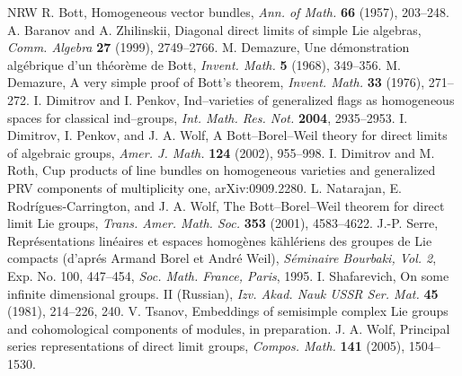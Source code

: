 \documentclass[12pt]{amsart}
\theoremstyle{remark}
\begin{document}
%
\begin{thebibliography}{NRW}
R. Bott, Homogeneous vector bundles, {\it Ann. of Math.} {\bf 66} (1957), 203--248.
A. Baranov and A. Zhilinskii, Diagonal direct limits of simple Lie algebras, 
{\it Comm. Algebra}  {\bf 27} (1999), 2749--2766.
M. Demazure, Une d\'emonstration alg\'ebrique d'un th\'eor\`eme de Bott, {\it Invent. Math.} 
{\bf 5} (1968), 349--356. 
M. Demazure, A very simple proof of Bott's theorem, {\it Invent. Math.} {\bf 33} (1976), 271--272.
I. Dimitrov and I. Penkov, Ind--varieties of generalized flags as homogeneous spaces for 
classical ind--groups, {\it Int. Math. Res. Not.} {\bf 2004}, 2935--2953.
I. Dimitrov, I. Penkov, and J. A. Wolf, A Bott--Borel--Weil theory for direct limits of 
algebraic groups, {\it Amer. J. Math.} {\bf 124} (2002), 955--998.
I. Dimitrov and M. Roth, Cup products of line bundles on homogeneous varieties and generalized
PRV components of multiplicity one, arXiv:0909.2280.
L. Natarajan, E. Rodr\'igues-Carrington, and J. A. Wolf, The Bott--Borel--Weil theorem for 
direct limit Lie groups, {\it Trans. Amer. Math. Soc.} {\bf 353} (2001), 4583--4622.
J.-P. Serre, Repr\'esentations lin\'eaires et espaces homog\`enes 
k\"ahl\'eriens des groupes de Lie compacts (d'apr\'es Armand Borel et Andr\'e Weil), 
 {\it S\'eminaire Bourbaki, Vol. 2}, Exp. No. 100, 447--454, {\it Soc. Math. France, Paris}, 1995.
I. Shafarevich, On some infinite dimensional groups. II (Russian), {\it Izv. Akad. Nauk USSR 
Ser. Mat.} {\bf 45} (1981), 214--226, 240.
V. Tsanov, Embeddings of semisimple complex Lie groups and cohomological components of modules,
in preparation.
J. A. Wolf, Principal series representations of direct limit groups, {\it Compos. Math.}
{\bf 141} (2005), 1504--1530.

\end{thebibliography}
\end{document}
